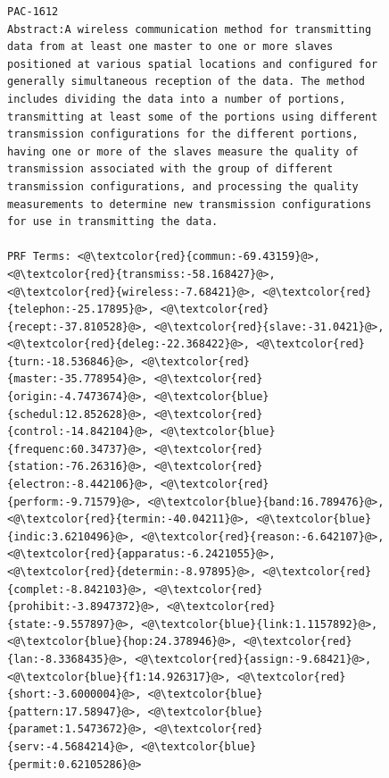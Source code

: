 \begin{figure}[htpb]
\begin{framed}
\vspace*{-2ex}
  \centering
 \begin{lstlisting}[basicstyle=\scriptsize\ttfamily , linewidth=\columnwidth,breaklines=true] 
PAC-1612
Abstract:A wireless communication method for transmitting data from at least one master to one or more slaves positioned at various spatial locations and configured for generally simultaneous reception of the data. The method includes dividing the data into a number of portions, transmitting at least some of the portions using different transmission configurations for the different portions, having one or more of the slaves measure the quality of transmission associated with the group of different transmission configurations, and processing the quality measurements to determine new transmission configurations for use in transmitting the data.

PRF Terms: <@\textcolor{red}{commun:-69.43159}@>, <@\textcolor{red}{transmiss:-58.168427}@>, <@\textcolor{red}{wireless:-7.68421}@>, <@\textcolor{red}{telephon:-25.17895}@>, <@\textcolor{red}{recept:-37.810528}@>, <@\textcolor{red}{slave:-31.0421}@>, <@\textcolor{red}{deleg:-22.368422}@>, <@\textcolor{red}{turn:-18.536846}@>, <@\textcolor{red}{master:-35.778954}@>, <@\textcolor{red}{origin:-4.7473674}@>, <@\textcolor{blue}{schedul:12.852628}@>, <@\textcolor{red}{control:-14.842104}@>, <@\textcolor{blue}{frequenc:60.34737}@>, <@\textcolor{red}{station:-76.26316}@>, <@\textcolor{red}{electron:-8.442106}@>, <@\textcolor{red}{perform:-9.71579}@>, <@\textcolor{blue}{band:16.789476}@>, <@\textcolor{red}{termin:-40.04211}@>, <@\textcolor{blue}{indic:3.6210496}@>, <@\textcolor{red}{reason:-6.642107}@>, <@\textcolor{red}{apparatus:-6.2421055}@>, <@\textcolor{red}{determin:-8.97895}@>, <@\textcolor{red}{complet:-8.842103}@>, <@\textcolor{red}{prohibit:-3.8947372}@>, <@\textcolor{red}{state:-9.557897}@>, <@\textcolor{blue}{link:1.1157892}@>, <@\textcolor{blue}{hop:24.378946}@>, <@\textcolor{red}{lan:-8.3368435}@>, <@\textcolor{red}{assign:-9.68421}@>, <@\textcolor{blue}{f1:14.926317}@>, <@\textcolor{red}{short:-3.6000004}@>, <@\textcolor{blue}{pattern:17.58947}@>, <@\textcolor{blue}{paramet:1.5473672}@>, <@\textcolor{red}{serv:-4.5684214}@>, <@\textcolor{blue}{permit:0.62105286}@>


\end{lstlisting}
\end{framed}
\end{figure}
